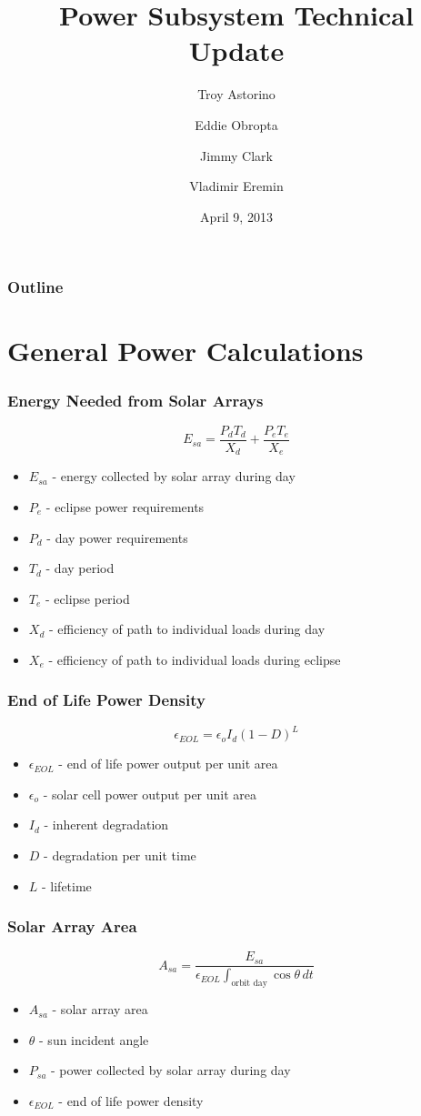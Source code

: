 \documentclass{beamer}
\title{Power Subsystem Technical Update}
\author{Troy Astorino \and Eddie Obropta \and Jimmy Clark \and Vladimir Eremin}
\date{April 9, 2013}
\institute[16.83 -- MIT]{Space Systems Design \\ Massachusetts Institute of
  Technology}
\begin{document}
\begin{frame}
\maketitle
\end{frame}

\begin{frame}
  \frametitle{Outline}
  \tableofcontents
\end{frame}

\section{General Power Calculations}
\begin{frame}
  \frametitle{Energy Needed from Solar Arrays}
  \[E_{sa} = \frac{P_d T_d}{X_d} + \frac{P_e T_e}{X_e}\]

  \begin{itemize}
  \item $E_{sa}$ - energy collected by solar array during day
  \item $P_e$ - eclipse power requirements
  \item $P_d$ - day power requirements
  \item $T_d$ - day period
  \item $T_e$ - eclipse period
  \item $X_d$ - efficiency of path to individual loads during day
  \item $X_e$ - efficiency of path to individual loads during eclipse
  \end{itemize}
\end{frame}

\begin{frame}
  \frametitle{End of Life Power Density}
  \[\epsilon_{EOL} = \epsilon_o I_d (1 - D)^L\]

  \begin{itemize}
  \item $\epsilon_{EOL}$ - end of life power output per unit area
  \item $\epsilon_o$ - solar cell power output per unit area
  \item $I_d$ - inherent degradation
  \item $D$ - degradation per unit time
  \item $L$ - lifetime
  \end{itemize}
\end{frame}

\begin{frame}
  \frametitle{Solar Array Area}
  \[A_{sa} = \frac{E_{sa}}{\epsilon_{EOL} \displaystyle \int_{\text{orbit day}} \cos{\theta}\,dt}\]

  \begin{itemize}
  \item $A_{sa}$ - solar array area
  \item $\theta$ - sun incident angle
  \item $P_{sa}$ - power collected by solar array during day
  \item $\epsilon_{EOL}$ - end of life power density
  \end{itemize}
\end{frame}
\end{document}
